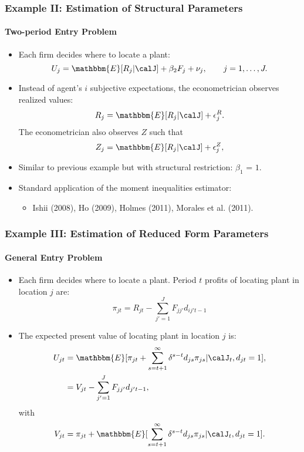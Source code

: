 \begin{frame}
\frametitle{Example II: Estimation of Structural Parameters}
\framesubtitle{Two-period Entry Problem}

\begin{itemize}
	\item Each firm decides where to locate a plant:
	\begin{equation*}
	U_{j}=\mathbbm{E}[R_{j}|\calJ] +\beta_{2}F_{j}+ \nu_{j},\qquad  j = 1,\dots,J.
	\end{equation*}
	\item Instead of agent's $i$ subjective expectations, the econometrician observes realized values:
	\begin{equation*}
	R_{j} = \mathbbm{E}[R_{j}|\calJ] + \epsilon^{R}_{j}.
	\end{equation*}
	The econometrician also observes $Z$ such that
	\begin{equation*}
	Z_{j} = \mathbbm{E}[R_{j}|\calJ] + \epsilon^{Z}_{j},
	\end{equation*}
	\item Similar to previous example but with structural restriction: $\beta_{1}$ = $1$.
	\item Standard application of the moment inequalities estimator:
	\begin{itemize}
		\item Ishii (2008), Ho (2009), Holmes (2011), Morales et al. (2011).
	\end{itemize}
\end{itemize}
\end{frame}
\begin{frame}
\frametitle{Example III: Estimation of Reduced Form Parameters}
\framesubtitle{General Entry Problem}

\begin{itemize}
	\item Each firm decides where to locate a plant. Period $t$ profits of locating plant in location $j$ are:
	\begin{equation*}
	\pi_{jt} = R_{jt}-\sum_{j'=1}^{J}F_{jj'}d_{ij't-1}
	\end{equation*}
	\item The expected present value of locating plant in location $j$ is:
	\begin{align*}
	U_{jt}&=\mathbbm{E}[\pi_{jt}+\sum_{s=t+1}^{\infty}\delta^{s-t}d_{js}\pi_{js}|\calJ_{t},d_{jt}=1],\\
	&=V_{jt}-\sum_{j'=1}^{J}F_{jj'}d_{j't-1},
	\end{align*}
	with
	\begin{equation*}
	V_{jt}=\pi_{jt}+\mathbbm{E}[\sum_{s=t+1}^{\infty}\delta^{s-t}d_{js}\pi_{js}|\calJ_{t},d_{jt}=1].
	\end{equation*}
\end{itemize}
\end{frame}
